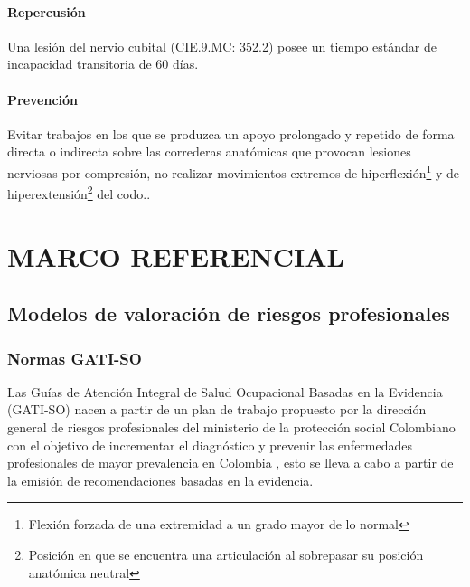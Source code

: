 \paragraph{Repercusión}
Una lesión del nervio cubital (CIE.9.MC: 352.2) posee un tiempo estándar de incapacidad transitoria de 60 días\parencite[6]{INSHT2017SindromeCodo}.
\paragraph{Prevención}
Evitar trabajos en los que se produzca un apoyo prolongado y repetido de forma directa o indirecta sobre las correderas anatómicas que provocan lesiones nerviosas por compresión, no realizar movimientos extremos de hiperflexión\footnote{Flexión forzada de una extremidad a un grado mayor de lo normal} y de hiperextensión\footnote{Posición en que se encuentra una articulación al sobrepasar su posición anatómica neutral} del codo.\parencite[5]{INSHT2017SindromeCodo}.
\section{MARCO REFERENCIAL}
\subsection{Modelos de valoración de riesgos profesionales}
\subsubsection{Normas GATI-SO}
Las Guías de Atención Integral de Salud Ocupacional Basadas en la Evidencia (GATI-SO) nacen a partir de un plan de trabajo propuesto por la dirección general de riesgos profesionales del ministerio de la protección social Colombiano con el objetivo de incrementar el diagnóstico y prevenir las enfermedades profesionales de
mayor prevalencia en Colombia \parencite[6]{MinisteriodeProteccionSocialdeColombia2006GuiaSuperiores}, esto se lleva a cabo a partir de la emisión de recomendaciones basadas en la evidencia.

